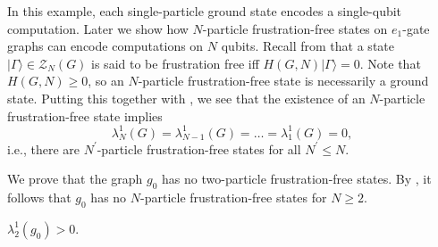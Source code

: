 \documentclass[../thesis-main/thesis-main]{subfiles}
\begin{document}
In this example, each single-particle ground state encodes a single-qubit computation. Later we show how $N$-particle frustration-free states on $e_{1}$-gate graphs can encode computations on $N$ qubits. Recall from  that a state $|\Gamma\rangle\in\mathcal{Z}_{N}(G)$ is said to be frustration free iff $H(G,N)|\Gamma\rangle=0.$ Note that $H(G,N)\geq0$, so an $N$-particle frustration-free state is necessarily a ground state. Putting this together with , we see that the existence of an $N$-particle frustration-free state implies
\[
\lambda_{N}^{1}(G)=\lambda_{N-1}^{1}(G)=\ldots=\lambda_{1}^{1}(G)=0,
\]
i.e., there are $N^{\prime}$-particle frustration-free states for all $N^{\prime}\leq N$. 

We prove that the graph $g_{0}$ has no two-particle frustration-free states. By , it follows that $g_0$ has no $N$-particle frustration-free states for $N\geq 2$.

\begin{lemma}
\label{lem:2particle}$\lambda_{2}^{1}(g_{0})>0$.
\end{lemma}
\end{document}
